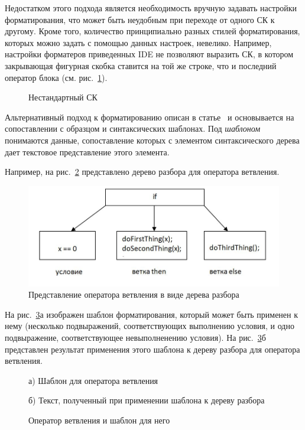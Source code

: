 \documentclass[conference]{IEEEtran}
\begin{document}
Недостатком этого подхода является необходимость вручную задавать настройки форматирования, что может быть неудобным при переходе от одного СК к другому.
Кроме того, количество принципиально разных стилей форматирования, которых можно задать с помощью данных настроек, невелико.
Например, настройки форматеров приведенных IDE не позволяют выразить СК, в котором закрывающая фигурная скобка ставится на той же строке, что и последний оператор блока (см. рис.~\ref{fig:unusualCC}).
\begin{figure}[h]
	\centering
	
	\caption{Нестандартный СК}
	\label{fig:unusualCC}
\end{figure}

Альтернативный подход к форматированию описан в статье~\cite{while} и основывается на сопоставлении с образцом и синтаксических шаблонах.
Под \emph{шаблоном} понимаются данные, сопоставление которых с элементом синтаксического дерева дает текстовое представление этого элемента.

Например, на рис.~\ref{fig:ifTree} представлено дерево разбора для оператора ветвления. 
\begin{figure}[h]
	\centering
	\includegraphics[width=.5\textwidth]{images/ifTree.jpg}
	\caption{Представление оператора ветвления в виде дерева разбора}
	\label{fig:ifTree}
\end{figure}

На рис.~\ref{fig:tmpltcodeintro}а изображен шаблон форматирования, который может быть применен к нему (несколько подвыражений, соответствующих выполнению условия, и одно подвыражение, соответствующее невыполненению условия).
На рис.~\ref{fig:tmpltcodeintro}б представлен результат применения этого шаблона к дереву разбора для оператора ветвления.

\begin{figure}[ht]
\noindent\begin{minipage}{.2\textwidth}
    
\caption*{а) Шаблон для оператора ветвления}    
\end{minipage}\hfill
\begin{minipage}{.25\textwidth}
    
\caption*{б) Текст, полученный при применении шаблона к дереву разбора}    
\end{minipage}
\caption{Оператор ветвления и шаблон для него}    
\label{fig:tmpltcodeintro}
\end{figure}
\end{document}
